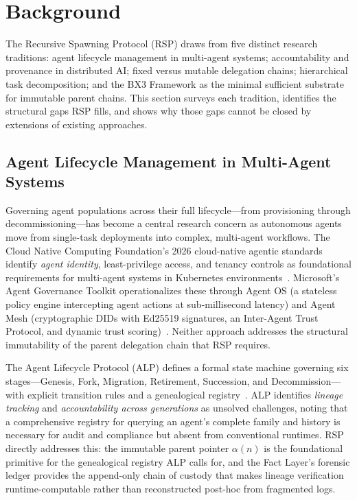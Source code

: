 \section{Background}
\label{sec:background}

The Recursive Spawning Protocol (RSP) draws from five distinct research traditions: agent lifecycle management in multi-agent systems; accountability and provenance in distributed AI; fixed versus mutable delegation chains; hierarchical task decomposition; and the BX3 Framework as the minimal sufficient substrate for immutable parent chains. This section surveys each tradition, identifies the structural gaps RSP fills, and shows why those gaps cannot be closed by extensions of existing approaches.

\subsection{Agent Lifecycle Management in Multi-Agent Systems}

Governing agent populations across their full lifecycle---from provisioning through decommissioning---has become a central research concern as autonomous agents move from single-task deployments into complex, multi-agent workflows. The Cloud Native Computing Foundation's 2026 cloud-native agentic standards identify \emph{agent identity}, least-privilege access, and tenancy controls as foundational requirements for multi-agent systems in Kubernetes environments~\cite{cncf-agentic-standards}. Microsoft's Agent Governance Toolkit operationalizes these through Agent OS (a stateless policy engine intercepting agent actions at sub-millisecond latency) and Agent Mesh (cryptographic DIDs with Ed25519 signatures, an Inter-Agent Trust Protocol, and dynamic trust scoring)~\cite{microsoft-agent-governance}. Neither approach addresses the structural immutability of the parent delegation chain that RSP requires.

The Agent Lifecycle Protocol (ALP) defines a formal state machine governing six stages---Genesis, Fork, Migration, Retirement, Succession, and Decommission---with explicit transition rules and a genealogical registry~\cite{alp2025}. ALP identifies \emph{lineage tracking} and \emph{accountability across generations} as unsolved challenges, noting that a comprehensive registry for querying an agent's complete family and history is necessary for audit and compliance but absent from conventional runtimes. RSP directly addresses this: the immutable parent pointer $\alpha(n)$ is the foundational primitive for the genealogical registry ALP calls for, and the Fact Layer's forensic ledger provides the append-only chain of custody that makes lineage verification runtime-computable rather than reconstructed post-hoc from fragmented logs.

